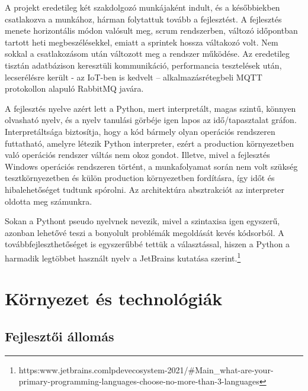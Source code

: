 \documentclass[12pt]{report}
\begin{document}
A projekt eredetileg két szakdolgozó munkájaként indult, és a későbbiekben csatlakozva a munkához, hárman folytattuk tovább a fejlesztést. A fejlesztés menete horizontális módon valósult meg, scrum rendszerben, változó időpontban tartott heti megbeszélésekkel, emiatt a sprintek hossza váltakozó volt. Nem sokkal a csatlakozásom után változott meg a rendszer működése. Az eredetileg tisztán adatbázison keresztüli kommunikáció, performancia tesztelések után, lecserélésre került - az IoT-ben is kedvelt – alkalmazásrétegbeli MQTT protokollon alapuló RabbitMQ javára.
\par
A fejlesztés nyelve azért lett a Python, mert interpretált, magas szintű, könnyen olvasható nyelv, és a nyelv tanulási görbéje igen lapos az idő/tapasztalat gráfon.
Interpretáltsága biztosítja, hogy a kód bármely olyan operációs rendszeren futtatható, amelyre létezik Python interpreter, ezért a production környezetben való operációs rendszer váltás nem okoz gondot. Illetve, mivel a fejlesztés Windows operációs rendszeren történt, a munkafolyamat során nem volt szükség tesztkörnyezetben és külön production környezetben fordításra, így időt és hibalehetőséget tudtunk spórolni. Az architektúra absztrakciót az interpreter oldotta meg számunkra.

Sokan a Pythont pseudo nyelvnek nevezik, mivel a szintaxisa igen egyszerű, azonban lehetővé teszi a bonyolult problémák megoldását kevés kódsorból. A továbbfejleszthetőséget is egyszerűbbé tettük a választással, hiszen a Python a harmadik legtöbbet használt nyelv a JetBrains kutatása szerint.\footnote{https:\/\/www.jetbrains.com\/lp\/devecosystem-2021/\#Main\_what-are-your-primary-programming-languages-choose-no-more-than-3-languages}




\chapter{Környezet és technológiák}

\section{Fejlesztői állomás}
\end{document}
